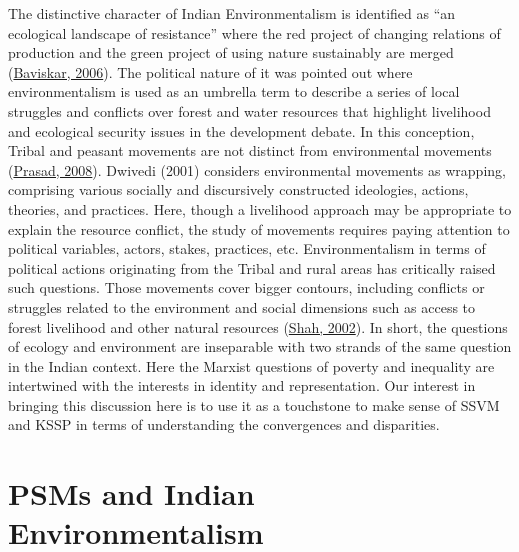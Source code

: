 \documentclass[twoside, 13pt]{article}
\begin{document}
{The distinctive character of Indian Environmentalism is identified as “an ecological landscape of resistance” where the red project of changing relations of production and the green project of using nature sustainably are merged (\underline{Baviskar, 2006}). The political nature of it was pointed out where environmentalism is used as an umbrella term to describe a series of local struggles and conflicts over forest and water resources that highlight livelihood and ecological security issues in the development debate. In this conception, Tribal and peasant movements are not distinct from environmental movements (\underline{Prasad, 2008}). Dwivedi (2001) considers environmental movements as wrapping, comprising various socially and discursively constructed ideologies, actions, theories, and practices. Here, though a livelihood approach may be appropriate to explain the resource conflict, the study of movements requires paying attention to political variables, actors, stakes, practices, etc. Environmentalism in terms of political actions originating from the Tribal and rural areas has critically raised such questions. Those movements cover bigger contours, including conflicts or struggles related to the environment and social dimensions such as access to forest livelihood and other natural resources (\underline{Shah, 2002}). In short, the questions of ecology and environment are inseparable with two strands of the same question in the Indian context. Here the Marxist questions of poverty and inequality are intertwined with the interests in identity and representation. Our interest in bringing this discussion here is to use it as a touchstone to make sense of SSVM and KSSP in terms of understanding the convergences and disparities.}



\newpage

{\fontsize{18}{20}\selectfont\section*{PSMs and Indian Environmentalism}}


\vspace{-.3cm}
\end{document}

